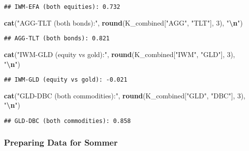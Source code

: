 \documentclass[
]{article}
\newenvironment{Shaded}{\begin{snugshade}}{\end{snugshade}}
\newcommand{\DecValTok}[1]{\textcolor[rgb]{0.00,0.00,0.81}{#1}}
\newcommand{\FunctionTok}[1]{\textcolor[rgb]{0.13,0.29,0.53}{\textbf{#1}}}
\newcommand{\NormalTok}[1]{#1}
\newcommand{\SpecialCharTok}[1]{\textcolor[rgb]{0.81,0.36,0.00}{\textbf{#1}}}
\newcommand{\StringTok}[1]{\textcolor[rgb]{0.31,0.60,0.02}{#1}}
\begin{document}
\begin{verbatim}
## IWM-EFA (both equities): 0.732
\end{verbatim}

\begin{Shaded}
\begin{Highlighting}[]
\FunctionTok{cat}\NormalTok{(}\StringTok{"AGG{-}TLT (both bonds):"}\NormalTok{, }\FunctionTok{round}\NormalTok{(K\_combined[}\StringTok{"AGG"}\NormalTok{, }\StringTok{"TLT"}\NormalTok{], }\DecValTok{3}\NormalTok{), }\StringTok{"}\SpecialCharTok{\textbackslash{}n}\StringTok{"}\NormalTok{)}
\end{Highlighting}
\end{Shaded}

\begin{verbatim}
## AGG-TLT (both bonds): 0.821
\end{verbatim}

\begin{Shaded}
\begin{Highlighting}[]
\FunctionTok{cat}\NormalTok{(}\StringTok{"IWM{-}GLD (equity vs gold):"}\NormalTok{, }\FunctionTok{round}\NormalTok{(K\_combined[}\StringTok{"IWM"}\NormalTok{, }\StringTok{"GLD"}\NormalTok{], }\DecValTok{3}\NormalTok{), }\StringTok{"}\SpecialCharTok{\textbackslash{}n}\StringTok{"}\NormalTok{)}
\end{Highlighting}
\end{Shaded}

\begin{verbatim}
## IWM-GLD (equity vs gold): -0.021
\end{verbatim}

\begin{Shaded}
\begin{Highlighting}[]
\FunctionTok{cat}\NormalTok{(}\StringTok{"GLD{-}DBC (both commodities):"}\NormalTok{, }\FunctionTok{round}\NormalTok{(K\_combined[}\StringTok{"GLD"}\NormalTok{, }\StringTok{"DBC"}\NormalTok{], }\DecValTok{3}\NormalTok{), }\StringTok{"}\SpecialCharTok{\textbackslash{}n}\StringTok{"}\NormalTok{)}
\end{Highlighting}
\end{Shaded}

\begin{verbatim}
## GLD-DBC (both commodities): 0.858
\end{verbatim}

\subsubsection{Preparing Data for
Sommer}\label{preparing-data-for-sommer}
\end{document}
